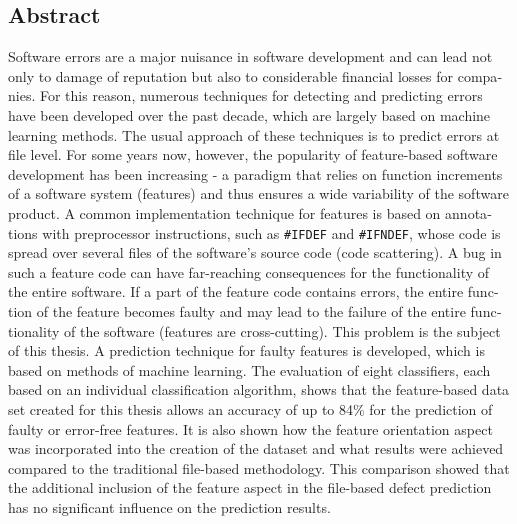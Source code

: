 \begin{otherlanguage}{english}
    \section*{Abstract}
    
Software errors are a major nuisance in software development and can lead not only to damage of reputation but also to considerable financial losses for companies. For this reason, numerous techniques for detecting and predicting errors have been developed over the past decade, which are largely based on machine learning methods. The usual approach of these techniques is to predict errors at file level. For some years now, however, the popularity of feature-based software development has been increasing - a paradigm that relies on function increments of a software system (features) and thus ensures a wide variability of the software product. A common implementation technique for features is based on annotations with preprocessor instructions, such as \texttt{\#IFDEF} and \texttt{\#IFNDEF}, whose code is spread over several files of the software's source code (\glqq code scattering\grqq). A bug in such a feature code can have far-reaching consequences for the functionality of the entire software. If a part of the feature code contains errors, the entire function of the feature becomes faulty and may lead to the failure of the entire functionality of the software (features are \glqq cross-cutting\grqq{}). This problem is the subject of this thesis. A prediction technique for faulty features is developed, which is based on methods of machine learning. The evaluation of eight classifiers, each based on an individual classification algorithm, shows that the feature-based data set created for this thesis allows an accuracy of up to 84\% for the prediction of faulty or error-free features. It is also shown how the feature orientation aspect was incorporated into the creation of the dataset and what results were achieved compared to the traditional file-based methodology. This comparison showed that the additional inclusion of the feature aspect in the file-based defect prediction has no significant influence on the prediction results.

\end{otherlanguage}
\cleardoublepage
